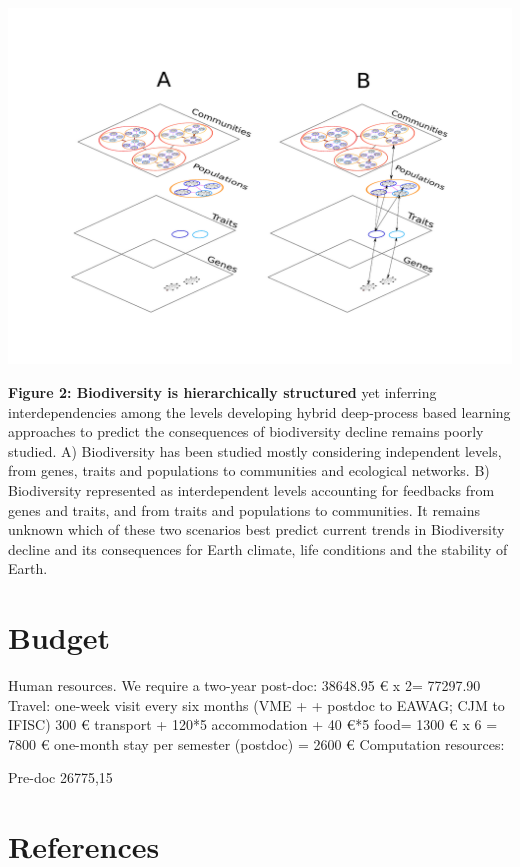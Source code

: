 \documentclass[authoryear,1p,12pt]{elsarticle}
\begin{document}
\begin{center}
  \vspace{-0.5 in}
        \hspace{-1 in}\includegraphics[width=1.05\textwidth]{Figure2.pdf}

     \vspace{-0.5 in}

     \caption{{\small {\bf Figure 2: Biodiversity is hierarchically
         structured} yet inferring interdependencies among the levels
       developing hybrid deep-process based learning approaches to
       predict the consequences of biodiversity decline remains poorly
       studied. A) Biodiversity has been studied mostly considering
       independent levels, from genes, traits and populations to
       communities and ecological networks. B) Biodiversity
       represented as interdependent levels accounting for feedbacks
       from genes and traits, and from traits and populations to
       communities. It remains unknown which of these two scenarios
       best predict current trends in Biodiversity decline and its
       consequences for Earth climate, life conditions and the
       stability of Earth.}}
     \end{center}

     
     \newpage
     \section{Budget}
     
     Human resources.
     We require a two-year post-doc: 38648.95 € x 2= 77297.90
     Travel: one-week visit every six months (VME + + postdoc to EAWAG; CJM to IFISC) 300 € transport + 120*5 accommodation + 40 €*5 food= 1300 € x 6 = 7800 €
     one-month stay per semester (postdoc) = 2600 €
     Computation resources: 
     
     Pre-doc 26775,15

     \newpage
     \section{References}


\end{document}
